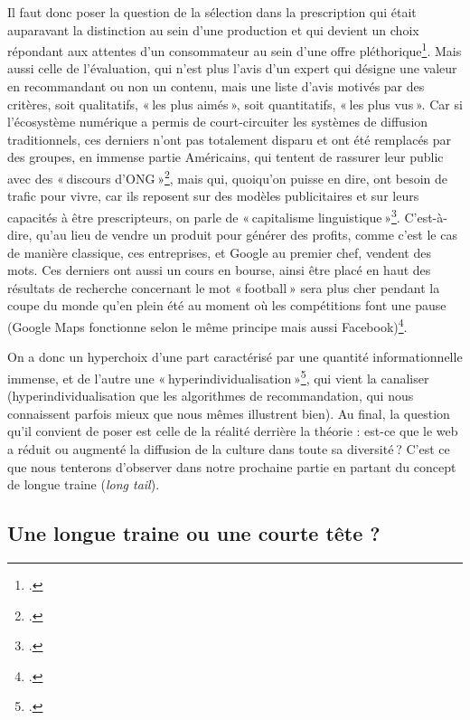 Il faut donc poser la question de la sélection dans la prescription qui était auparavant la distinction au sein d’une production et qui devient un choix répondant aux attentes d’un consommateur au sein d’une offre pléthorique\footcite{ertzscheid2023}. Mais aussi celle de l’évaluation, qui n’est plus l’avis d’un expert qui désigne une valeur en recommandant ou non un contenu, mais une liste d’avis motivés par des critères, soit qualitatifs, « les plus aimés », soit quantitatifs, « les plus vus ». Car si l’écosystème numérique a permis de court-circuiter les systèmes de diffusion traditionnels, ces derniers n’ont pas totalement disparu et ont été remplacés par des groupes, en immense partie Américains, qui tentent de rassurer leur public avec des « discours d’ONG »\footcite[p. 3]{laugee__2013}, mais qui, quoiqu’on puisse en dire, ont besoin de trafic pour vivre, car ils reposent sur des modèles publicitaires et sur leurs capacités à être prescripteurs, on parle de « capitalisme linguistique »\footcite{kaplan_quand_2011}. C’est-à-dire, qu’au lieu de vendre un produit pour générer des profits, comme c’est le cas de manière classique, ces entreprises, et Google au premier chef, vendent des mots. Ces derniers ont aussi un cours en bourse, ainsi être placé en haut des résultats de recherche concernant le mot « football » sera plus cher pendant la coupe du monde qu’en plein été au moment où les compétitions font une pause (Google Maps fonctionne selon le même principe mais aussi Facebook)\footcite{kaplan_quand_2011}.

On a donc un hyperchoix d’une part caractérisé par une quantité informationnelle immense, et de l’autre une « hyperindividualisation »\footcite[p. 3]{laugee__2013}, qui vient la canaliser (hyperindividualisation que les algorithmes de recommandation, qui nous connaissent parfois mieux que nous mêmes illustrent bien). Au final, la question qu’il convient de poser est celle de la réalité derrière la théorie : est-ce que le web a réduit ou augmenté la diffusion de la culture dans toute sa diversité ? C’est ce que nous tenterons d’observer dans notre prochaine partie en partant du concept de longue traine (\textit{long tail}).

\subsection{Une longue traine ou une courte tête ?}

